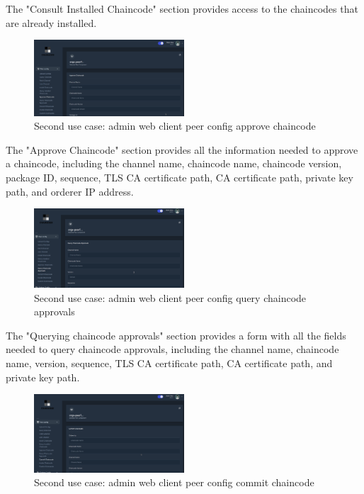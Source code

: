 The "Consult Installed Chaincode" section provides access to the chaincodes that are already installed.

\begin{figure}[H]
    \centering
    \includegraphics[width=0.5\textwidth]{assets/use-case-2/peer-config-approve-chaincode.png} %
    \caption{Second use case: admin web client peer config approve chaincode}
    \label{fig:sample-image} 
\end{figure}

The "Approve Chaincode" section provides all the information needed to approve a chaincode, including the channel name, chaincode name, chaincode version, package ID, sequence, TLS CA certificate path, CA certificate path, private key path, and orderer IP address.

\begin{figure}[H]
    \centering
    \includegraphics[width=0.5\textwidth]{assets/use-case-2/peer-config-query-chaincode-approvals.png} %
    \caption{Second use case: admin web client peer config query chaincode approvals}
    \label{fig:sample-image} 
\end{figure}

The "Querying chaincode approvals" section provides a form with all the fields needed to query chaincode approvals, including the channel name, chaincode name, version, sequence, TLS CA certificate path, CA certificate path, and private key path.

\begin{figure}[H]
    \centering
    \includegraphics[width=0.5\textwidth]{assets/use-case-2/peer-config-commit-chaincode.png} %
    \caption{Second use case: admin web client peer config commit chaincode}
    \label{fig:sample-image} 
\end{figure}

